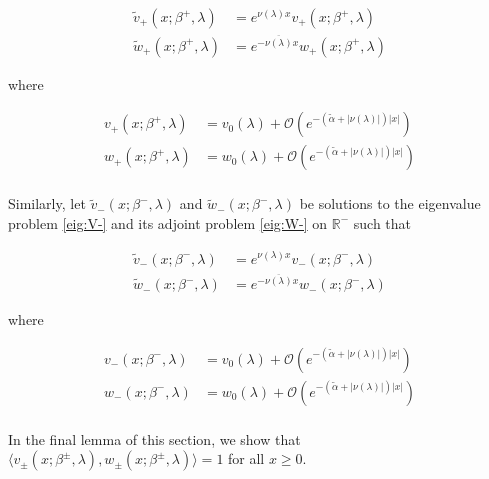 \documentclass[12pt]{article}
\def\R{{\mathbb R}}
\begin{document}
\begin{align}
\tilde{v}_+(x; \beta^+, \lambda) &= e^{\nu(\lambda) x } v_+(x; \beta^+, \lambda) \label{tildev+} \\
\tilde{w}_+(x; \beta^+, \lambda) &= e^{-\overline{\nu(\lambda)} x } w_+(x; \beta^+, \lambda) \label{tildew+} 
\end{align}

where

\begin{align*}
v_+(x; \beta^+, \lambda) &= v_0(\lambda) + \mathcal{O}(e^{-(\tilde{\alpha} + |\nu(\lambda)|)|x|}) \\
w_+(x; \beta^+, \lambda) &= w_0(\lambda) + \mathcal{O}(e^{-(\tilde{\alpha} + |\nu(\lambda)|)|x|})\\
\end{align*}

Similarly, let $\tilde{v}_-(x; \beta^-, \lambda)$ and $\tilde{w}_-(x; \beta^-, \lambda)$ be solutions to the eigenvalue problem \eqref{eig:V-} and its adjoint problem \eqref{eig:W-} on $\R^-$ such that

\begin{align}
\tilde{v}_-(x; \beta^-, \lambda) &= e^{\nu(\lambda) x } v_-(x; \beta^-, \lambda) \label{tildev-} \\
\tilde{w}_-(x; \beta^-, \lambda) &= e^{-\overline{\nu(\lambda)} x } w_-(x; \beta^-, \lambda) \label{tildew-} 
\end{align}

where

\begin{align*}
v_-(x; \beta^-, \lambda) &= v_0(\lambda) + \mathcal{O}(e^{-(\tilde{\alpha} + |\nu(\lambda)|)|x|}) \\
w_-(x; \beta^-, \lambda) &= w_0(\lambda) + \mathcal{O}(e^{-(\tilde{\alpha} + |\nu(\lambda)|)|x|})\\
\end{align*}

In the final lemma of this section, we show that $\langle v_\pm(x; \beta^\pm, \lambda), w_\pm(x; \beta^\pm, \lambda) \rangle = 1$ for all $x \geq 0$.

\end{document}
